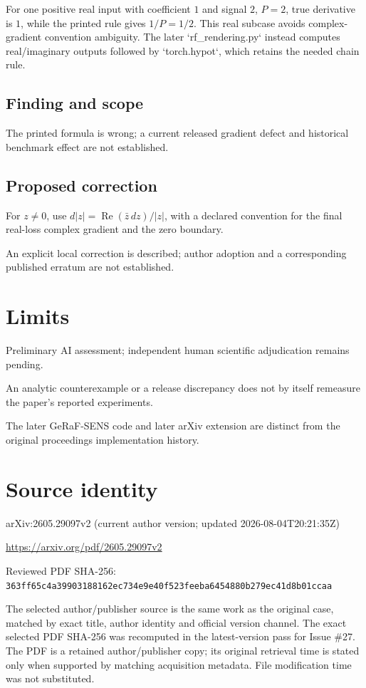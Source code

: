 \documentclass[11pt]{article}
\begin{document}
For one positive real input with coefficient \(1\) and signal \(2\), \(P=2\), true derivative is \(1\), while the printed rule gives \(1/P=1/2\). This real subcase avoids complex-gradient convention ambiguity. The later `rf\_rendering.py` instead computes real/imaginary outputs followed by `torch.hypot`, which retains the needed chain rule.

\subsection*{Finding and scope}

The printed formula is wrong; a current released gradient defect and historical benchmark effect are not established.

\subsection*{Proposed correction}

For \(z\ne0\), use \(d|z|=\operatorname{Re}(\bar z\,dz)/|z|\), with a declared convention for the final real-loss complex gradient and the zero boundary.

An explicit local correction is described; author adoption and a corresponding published erratum are not established.

\section*{Limits}

Preliminary AI assessment; independent human scientific adjudication remains pending.\par

An analytic counterexample or a release discrepancy does not by itself remeasure the paper’s reported experiments.\par

The later GeRaF-SENS code and later arXiv extension are distinct from the original proceedings implementation history.\par

\section*{Source identity}

arXiv:2605.29097v2 (current author version; updated 2026-08-04T20:21:35Z)

\url{https://arxiv.org/pdf/2605.29097v2}

Reviewed PDF SHA-256: \nolinkurl{363ff65c4a39903188162ec734e9e40f523feeba6454880b279ec41d8b01ccaa}

The selected author/publisher source is the same work as the original case, matched by exact title, author identity and official version channel. The exact selected PDF SHA-256 was recomputed in the latest-version pass for Issue \#27. The PDF is a retained author/publisher copy; its original retrieval time is stated only when supported by matching acquisition metadata. File modification time was not substituted.
\end{document}

